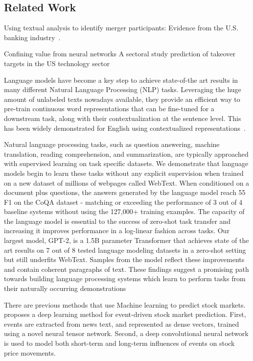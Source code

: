 \documentclass[11pt]{article}
\begin{document}
\subsection{Related Work}


Using textual analysis to identify merger participants: Evidence from the U.S. banking industry~\cite{xxx}.

Confining value from neural networks
A sectoral study prediction of takeover targets
in the US technology sector


Language models have become a key step to achieve state-of-the art results in many different Natural Language Processing (NLP)
tasks. Leveraging the huge amount of unlabeled texts nowadays available, they provide an efficient way to pre-train continuous word
representations that can be fine-tuned for a downstream task, along with their contextualization at the sentence level. This has been
widely demonstrated for English using contextualized representations~\cite{dai2015, peters2018, howard2018, radford2018, devlin2019, yang2019}.

Natural language processing tasks, such as question answering, machine translation, reading comprehension, and summarization, are typically
approached with supervised learning on task specific datasets. We demonstrate that language
models begin to learn these tasks without any explicit supervision when trained on a new dataset
of millions of webpages called WebText. When
conditioned on a document plus questions, the answers generated by the language model reach 55
F1 on the CoQA dataset - matching or exceeding
the performance of 3 out of 4 baseline systems
without using the 127,000+ training examples.
The capacity of the language model is essential
to the success of zero-shot task transfer and increasing it improves performance in a log-linear
fashion across tasks. Our largest model, GPT-2,
is a 1.5B parameter Transformer that achieves
state of the art results on 7 out of 8 tested language modeling datasets in a zero-shot setting
but still underfits WebText. Samples from the
model reflect these improvements and contain coherent paragraphs of text. These findings suggest
a promising path towards building language processing systems which learn to perform tasks from
their naturally occurring demonstrations~\cite{radford2019} 

There are previous methods that use Machine learning to predict stock
markets.~\cite{ding2015} proposes a deep learning method for
event-driven stock market prediction. First, events are extracted from news text, and represented as dense vectors,
trained using a novel neural tensor network. Second, a deep convolutional neural network is used to model both short-term and
long-term influences of events on stock price movements.
\end{document}
